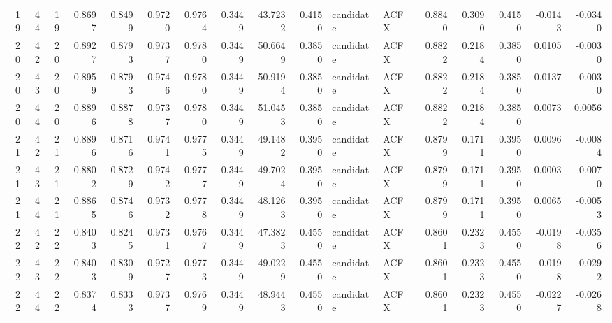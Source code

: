 \begin{tabular}{rrrrrrrrrrllrrrrr}
 19 &    44 &           19 &  0.8697 &   0.8499 &     0.9720 &      0.9764 &           0.3449 &      43.7232 &  0.4150 & candidate &   ACFX &          0.8840 &               0.3090 &                     0.4150 &  -0.0143 &   -0.0340 \\
 20 &    42 &           20 &  0.8927 &   0.8793 &     0.9737 &      0.9780 &           0.3449 &      50.6649 &  0.3850 & candidate &   ACFX &          0.8822 &               0.2184 &                     0.3850 &   0.0105 &   -0.0030 \\
 20 &    43 &           20 &  0.8959 &   0.8793 &     0.9746 &      0.9780 &           0.3449 &      50.9194 &  0.3850 & candidate &   ACFX &          0.8822 &               0.2184 &                     0.3850 &   0.0137 &   -0.0030 \\
 20 &    44 &           20 &  0.8896 &   0.8878 &     0.9737 &      0.9780 &           0.3449 &      51.0453 &  0.3850 & candidate &   ACFX &          0.8822 &               0.2184 &                     0.3850 &   0.0073 &    0.0056 \\
 21 &    42 &           21 &  0.8896 &   0.8716 &     0.9741 &      0.9775 &           0.3449 &      49.1482 &  0.3950 & candidate &   ACFX &          0.8799 &               0.1711 &                     0.3950 &   0.0096 &   -0.0084 \\
 21 &    43 &           21 &  0.8802 &   0.8729 &     0.9742 &      0.9777 &           0.3449 &      49.7024 &  0.3950 & candidate &   ACFX &          0.8799 &               0.1711 &                     0.3950 &   0.0003 &   -0.0070 \\
 21 &    44 &           21 &  0.8865 &   0.8746 &     0.9732 &      0.9778 &           0.3449 &      48.1263 &  0.3950 & candidate &   ACFX &          0.8799 &               0.1711 &                     0.3950 &   0.0065 &   -0.0053 \\
 22 &    42 &           22 &  0.8403 &   0.8245 &     0.9731 &      0.9767 &           0.3449 &      47.3823 &  0.4550 & candidate &   ACFX &          0.8601 &               0.2323 &                     0.4550 &  -0.0198 &   -0.0356 \\
 22 &    43 &           22 &  0.8403 &   0.8309 &     0.9727 &      0.9773 &           0.3449 &      49.0229 &  0.4550 & candidate &   ACFX &          0.8601 &               0.2323 &                     0.4550 &  -0.0198 &   -0.0292 \\
 22 &    44 &           22 &  0.8374 &   0.8333 &     0.9737 &      0.9769 &           0.3449 &      48.9443 &  0.4550 & candidate &   ACFX &          0.8601 &               0.2323 &                     0.4550 &  -0.0227 &   -0.0268 \\

\end{tabular}
